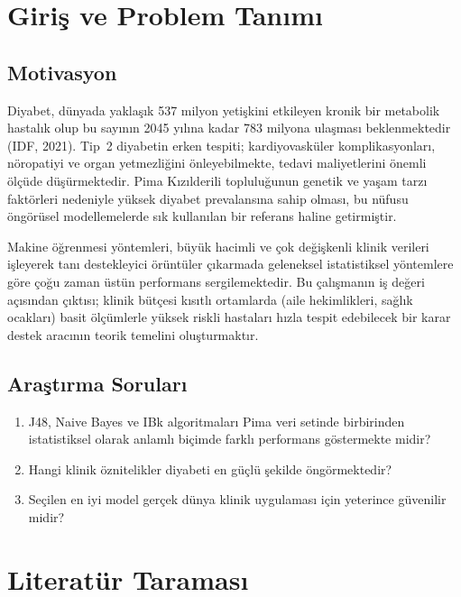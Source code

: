 \documentclass[12pt,a4paper]{article}
\begin{document}
\newpage
\tableofcontents
\newpage

\section{Giriş ve Problem Tanımı}

\subsection{Motivasyon}

Diyabet, dünyada yaklaşık 537 milyon yetişkini etkileyen kronik bir metabolik
hastalık olup bu sayının 2045 yılına kadar 783 milyona ulaşması beklenmektedir
(IDF, 2021). Tip~2 diyabetin erken tespiti; kardiyovasküler komplikasyonları,
nöropatiyi ve organ yetmezliğini önleyebilmekte, tedavi maliyetlerini önemli
ölçüde düşürmektedir. Pima Kızılderili topluluğunun genetik ve yaşam tarzı
faktörleri nedeniyle yüksek diyabet prevalansına sahip olması, bu nüfusu
öngörüsel modellemelerde sık kullanılan bir referans haline getirmiştir.

Makine öğrenmesi yöntemleri, büyük hacimli ve çok değişkenli klinik verileri
işleyerek tanı destekleyici örüntüler çıkarmada geleneksel istatistiksel
yöntemlere göre çoğu zaman üstün performans sergilemektedir. Bu çalışmanın iş
değeri açısından çıktısı; klinik bütçesi kısıtlı ortamlarda (aile hekimlikleri,
sağlık ocakları) basit ölçümlerle yüksek riskli hastaları hızla tespit edebilecek
bir karar destek aracının teorik temelini oluşturmaktır.

\subsection{Araştırma Soruları}

\begin{enumerate}
  \item J48, Naive Bayes ve IBk algoritmaları Pima veri setinde birbirinden
        istatistiksel olarak anlamlı biçimde farklı performans göstermekte midir?
  \item Hangi klinik öznitelikler diyabeti en güçlü şekilde öngörmektedir?
  \item Seçilen en iyi model gerçek dünya klinik uygulaması için yeterince
        güvenilir midir?
\end{enumerate}

\section{Literatür Taraması}
\end{document}
